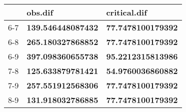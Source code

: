 \begin{table}[ht]
\centering
\begin{tabular}{rll}
  \hline
 & obs.dif & critical.dif \\ 
  \hline
6-7 & \textbf{139.546448087432} & \textbf{77.7478100179392} \\ 
  6-8 & \textbf{265.180327868852} & \textbf{77.7478100179392} \\ 
  6-9 & \textbf{397.098360655738} & \textbf{95.2212315813986} \\ 
  7-8 & \textbf{125.633879781421} & \textbf{54.9760036860882} \\ 
  7-9 & \textbf{257.551912568306} & \textbf{77.7478100179392} \\ 
  8-9 & \textbf{131.918032786885} & \textbf{77.7478100179392} \\ 
   \hline
\end{tabular}
\end{table}
